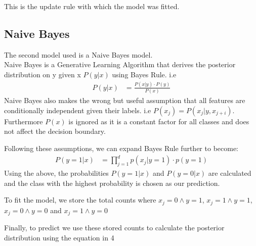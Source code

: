 \documentclass{sigchi}
\begin{document}
This is the update rule with which the model was fitted.
\subsection{Naive Bayes}
The second model used is a Naive Bayes model.\\
Naive Bayes is a Generative Learning Algorithm that derives the posterior distribution on y given x $P(y|x)$ using Bayes Rule. i.e
\begin{align*}
    P(y|x) &= \frac{P(x|y) \cdot P(y)}{P(x)}
\end{align*}
Naive Bayes also makes the wrong but useful assumption that all features are conditionally independent given their labels. i.e $P(x_j) = P(x_j| y, x_{j+i})$.
Furthermore $P(x)$ is ignored as it is a constant factor for all classes and does not affect the decision boundary.

Following these assumptions, we can expand Bayes Rule further to become:
\begin{align}
    P(y = 1|x) &= \prod_{j=1}^{d} p(x_j | y = 1) \cdot p(y=1)
\end{align}
Using the above, the probabilities $P(y = 1 | x)$ and $P(y = 0 | x)$ are calculated and the class with the highest probability is
chosen as our prediction.

To fit the model, we store the total counts where 
$x_j = 0 \land y = 1$,
$x_j = 1 \land y = 1$,
$x_j = 0 \land y = 0$ and 
$x_j = 1 \land y = 0$

Finally, to predict we use these stored counts to calculate the posterior distribution using the equation in 4


\end{document}
